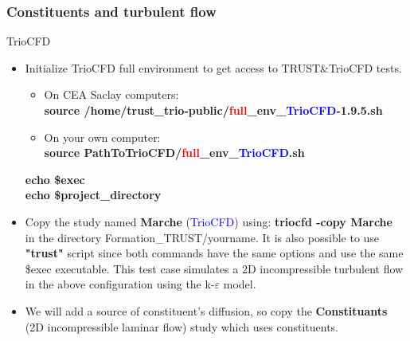 \documentclass[10pt, hyperref={unicode=true,pdfusetitle, bookmarks=true,bookmarksnumbered=false,bookmarksopen=false, breaklinks=false,pdfborder={0 0l 1},backref=true,colorlinks=true,linkcolor=darkblue,pageanchor}]{beamer}
\begin{document}
\begin{frame}
\frametitle{Constituents and turbulent flow}
\begin{block}{TrioCFD}

\begin{itemize}

\item Initialize TrioCFD full environment to get access to TRUST\&TrioCFD tests.\\
{\small{
\begin{itemize}
\item On CEA Saclay computers:\\
\textbf{source /home/trust\_trio-public/\textcolor{red}{full}\_env\_\textcolor{blue}{TrioCFD}-1.9.5.sh }

\item On your own computer:\\
\textbf{source PathToTrioCFD/\textcolor{red}{full}\_env\_\textcolor{blue}{TrioCFD}.sh}

\end{itemize}
\textbf{echo \$exec} \\
\textbf{echo \$project\_directory} \\
}}
\item Copy the study named \textbf{Marche} (\textcolor{blue}{TrioCFD}) using: \textbf{triocfd -copy Marche}\\
in the directory Formation\_TRUST/yourname. It is also possible to use \textbf{"trust"} script since both commands have the same options and use the same \$exec executable. This test case simulates a 2D incompressible turbulent flow in the above configuration using the k-$\varepsilon$ model.

\item We will add a source of constituent's diffusion, so copy the \textbf{Constituants} (2D incompressible laminar flow) study which uses constituents.




\end{itemize}

\end{block}
\end{frame}
\end{document}
